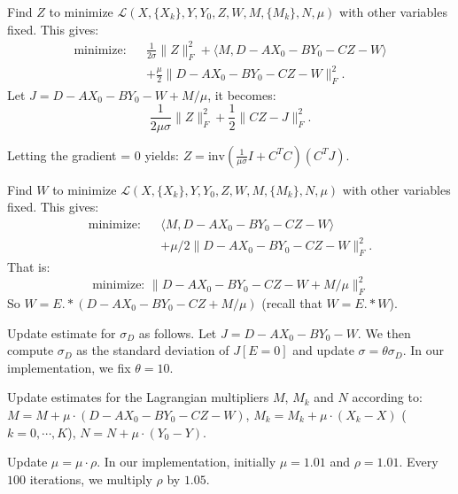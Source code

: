 \begin{senumerate}
\item Find $Z$ to minimize
$\mathcal{L}(X,\{X_k\},Y,Y_0,Z,W,M,\{M_k\},N,\mu)$ with other
variables fixed. This gives:
\begin{eqnarray}
  \text{minimize:} && \frac{1}{2\sigma} \|Z\|_F^2 + \langle M,D-AX_{0}-BY_0-CZ-W\rangle \nonumber\\
&&    + \frac{\mu}{2} \|D-AX_{0}-BY_0-CZ-W\|_F^2.\nonumber
\end{eqnarray}
Let $J = D-AX_0-BY_0-W+M/\mu$, it becomes:
\[\frac{1}{2\mu\sigma} \|Z\|_F^2 + \frac{1}{2} \|CZ-J\|_F^2.\]

Letting the gradient = 0 yields:
$Z = \mathrm{inv}(\frac{1}{\mu\sigma} I + C^TC) (C^T J)$.

\item Find $W$ to minimize
$\mathcal{L}(X,\{X_k\},Y,Y_0,Z,W,M,\{M_k\},N,\mu)$ with other
variables fixed. This gives:
\begin{eqnarray*}
\text{minimize:} && \langle M, D-AX_0-BY_0-CZ-W \rangle \\
                 && + \mu/2\|D-AX_0-BY_0-CZ-W\|_F^2.
\end{eqnarray*}
That is:
\[
\text{minimize:~} \|D-AX_0-BY_0-CZ-W+M/\mu\|_F^2 
\]
So $W = E.*(D-AX_0-BY_0-CZ+M/\mu)$ (recall that $W=E.*W$).

\item Update estimate for $\sigma_D$ as follows.  Let
  $J=D-AX_0-BY_0-W$.  We then compute $\sigma_D$ as the standard
  deviation of $J[E=0]$ and update $\sigma = \theta \sigma_D$.  In our
  implementation, we fix $\theta=10$.

  
\item Update estimates for the Lagrangian multipliers $M$, $M_k$ and
  $N$ according to:
$M = M + \mu\cdot (D-AX_0-BY_0-CZ-W)$, $M_k = M_k + \mu\cdot (X_k-X)$
  ($k=0,\cdots,K$), $N = N + \mu\cdot (Y_0-Y)$.

\item Update $\mu = \mu \cdot \rho$.  In our implementation, initially
  $\mu = 1.01$ and $\rho = 1.01$.  Every $100$ iterations, we multiply
  $\rho$ by $1.05$.
  
\end{senumerate}



